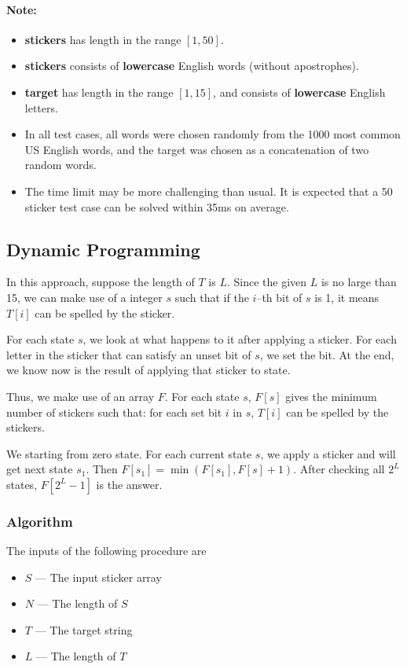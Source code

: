 \paragraph{Note:}
\begin{itemize}
\item \textbf{stickers} has length in the range $[1, 50]$.
\item \textbf{stickers} consists of \textbf{lowercase} English words (without apostrophes).
\item \textbf{target} has length in the range $[1, 15]$, and consists of \textbf{lowercase} English letters.
\item In all test cases, all words were chosen randomly from the 1000 most common US English words, and the target was chosen as a concatenation of two random words.
\item The time limit may be more challenging than usual. It is expected that a 50 sticker test case can be solved within 35ms on average.
\end{itemize}

\subsection{Dynamic Programming}
In this approach, suppose the length of $T$ is $L$. Since the given $L$ is no large than 15, we can make use of a integer $s$  such that if the $i$--th bit of $s$ is 1, it means $T[i]$ can be spelled by the sticker. 


For each state $s$, we look at what happens to it after applying a sticker. For each letter in the sticker that can satisfy an unset bit of $s$, we set the bit. At the end, we know now is the result of applying that sticker to state. 

Thus, we make use of an array $F$. For each state $s$, $F[s]$ gives the minimum number of stickers such that: for each set bit $i$ in $s$, $T[i]$ can be spelled by the stickers. 

We starting from zero state. For each current state $s$, we apply a sticker and will get next state $s_1$. Then $F[s_1]=\min(F[s_1], F[s]+1)$. After checking all $2^L$ states, $F[2^L-1]$ is the answer.

\subsubsection{Algorithm}
The inputs of the following procedure are
\begin{itemize}
    \item $S$ --- The input sticker array
    \item $N$ --- The length of $S$
    \item $T$ --- The target string
    \item $L$ --- The length of $T$
\end{itemize}

